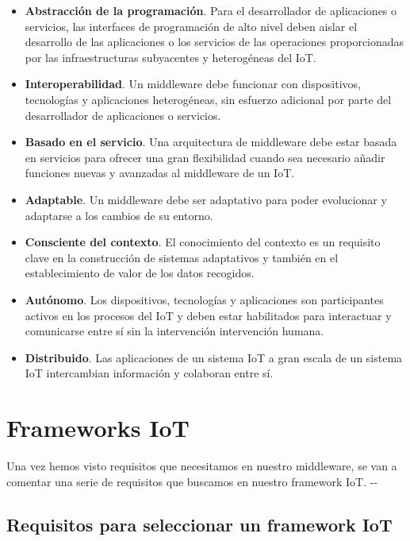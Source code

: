 {\begin{itemize}
    \item \textbf{Abstracción de la programación}. Para el desarrollador de aplicaciones o servicios, las interfaces de programación de alto nivel deben aislar el desarrollo de las aplicaciones o los servicios de las operaciones proporcionadas por las infraestructuras subyacentes y heterogéneas del IoT. 
    \item \textbf{Interoperabilidad}. Un middleware debe funcionar con dispositivos, tecnologías y aplicaciones heterogéneas, sin esfuerzo adicional por parte del desarrollador de aplicaciones o servicios.
    \item \textbf{Basado en el servicio}. Una arquitectura de middleware debe estar basada en servicios para ofrecer una gran flexibilidad cuando sea necesario añadir funciones nuevas y avanzadas al middleware de un IoT.
    \item \textbf{Adaptable}. Un middleware debe ser adaptativo para poder evolucionar y adaptarse a los cambios de su entorno.
    \item \textbf{Consciente del contexto}. El conocimiento del contexto es un requisito clave en la construcción de sistemas adaptativos y también en el establecimiento de valor de los datos recogidos.
    \item \textbf{Autónomo}. Los dispositivos, tecnologías y aplicaciones son participantes activos en los procesos del IoT y deben estar habilitados para interactuar y comunicarse entre sí sin la intervención intervención humana.
    \item \textbf{Distribuido}.  Las aplicaciones de un sistema IoT a gran escala de un sistema IoT intercambian información y colaboran entre sí.
\end{itemize}


\section{Frameworks IoT}

Una vez hemos visto requisitos que necesitamos en nuestro middleware, se van a comentar una serie de requisitos que buscamos en nuestro framework IoT. \cite{agarwal2020investigating}-\cite{dumitru2017iot}-\cite{nakhuva2015study}

\subsection{Requisitos para seleccionar un framework IoT} \label{requisitosFramework}

}
